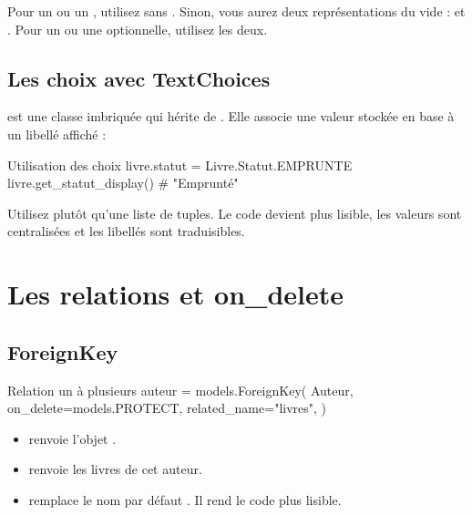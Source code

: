 \begin{bonne}
Pour un  ou un , utilisez  sans
. Sinon, vous aurez deux représentations du vide :  et
. Pour un  ou une  optionnelle, utilisez
les deux.
\end{bonne}

\subsection{Les choix avec TextChoices}

 est une classe imbriquée qui hérite de .
Elle associe une valeur stockée en base à un libellé affiché :

\begin{codebox}[python]{Utilisation des choix}
livre.statut = Livre.Statut.EMPRUNTE
livre.get_statut_display()   # "Emprunté"
\end{codebox}

\begin{bonne}
Utilisez  plutôt qu'une liste de tuples. Le code devient plus
lisible, les valeurs sont centralisées et les libellés sont traduisibles.
\end{bonne}

\section{Les relations et on\_delete}

\subsection{ForeignKey}

\begin{codebox}[python]{Relation un à plusieurs}
auteur = models.ForeignKey(
    Auteur,
    on_delete=models.PROTECT,
    related_name="livres",
)
\end{codebox}

\begin{itemize}
  \item {} renvoie l'objet .
  \item {} renvoie les livres de cet auteur.
  \item {} remplace le nom par défaut . Il rend
        le code plus lisible.
\end{itemize}

